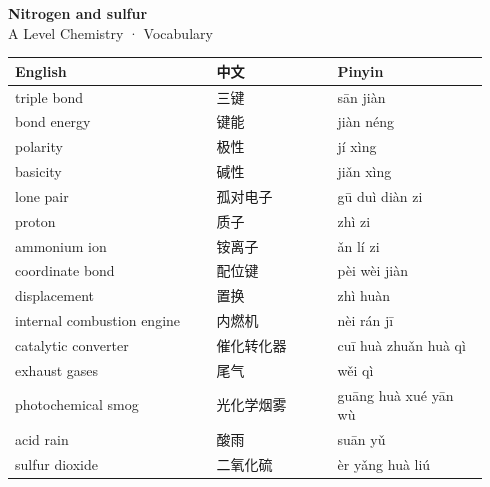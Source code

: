 \documentclass[11pt]{article}
\begin{document}
\begin{center}
  {\LARGE\bfseries Nitrogen and sulfur}\\[0.35em]
  {\large A Level Chemistry · Vocabulary}
\end{center}
\vspace{0.6em}

\begin{longtable}{@{}p{0.40\linewidth}p{0.24\linewidth}p{0.30\linewidth}@{}}
\toprule
\textbf{English} & \textbf{中文} & \textbf{Pinyin} \\
\midrule
\endhead
\bottomrule
\endlastfoot
triple bond & 三键 & sān jiàn \\
bond energy & 键能 & jiàn néng \\
polarity & 极性 & jí xìng \\
basicity & 碱性 & jiǎn xìng \\
lone pair & 孤对电子 & gū duì diàn zi \\
proton & 质子 & zhì zi \\
ammonium ion & 铵离子 & ǎn lí zi \\
coordinate bond & 配位键 & pèi wèi jiàn \\
displacement & 置换 & zhì huàn \\
internal combustion engine & 内燃机 & nèi rán jī \\
catalytic converter & 催化转化器 & cuī huà zhuǎn huà qì \\
exhaust gases & 尾气 & wěi qì \\
photochemical smog & 光化学烟雾 & guāng huà xué yān wù \\
acid rain & 酸雨 & suān yǔ \\
sulfur dioxide & 二氧化硫 & èr yǎng huà liú \\
\end{longtable}
\end{document}
